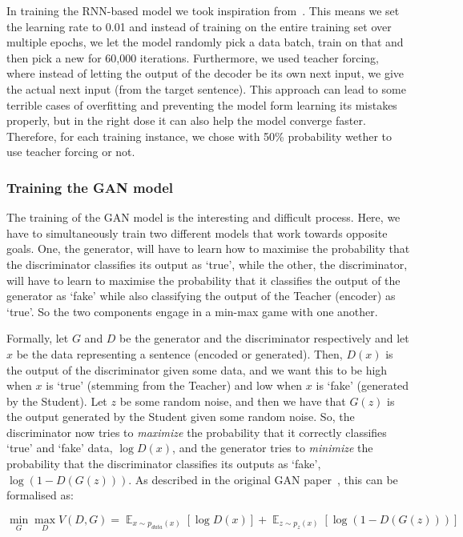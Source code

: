 \documentclass{article}
\DeclareMathOperator*{\E}{\mathbb{E}}
\begin{document}
In training the RNN-based model we took inspiration
from~\cite{pytorchTutorialAtt}. This means we set the learning rate to 0.01 and
instead of training on the entire training set over multiple epochs, we let the
model randomly pick a data batch, train on that and then pick a new for 60,000
iterations. Furthermore, we used teacher forcing, where instead of letting the
output of the decoder be its own next input, we give the actual next input (from
the target sentence). This approach can lead to some terrible cases of
overfitting and preventing the model form learning its mistakes properly, but in
the right dose it can also help the model converge faster. Therefore, for each
training instance, we chose with 50\% probability wether to use teacher forcing
or not.


\subsubsection{Training the GAN model}\label{sec:trainingGAN}

The training of the GAN model is the interesting and difficult process. Here, we
have to simultaneously train two different models that work towards opposite
goals. One, the generator, will have to learn how to maximise the probability
that the discriminator classifies its output as `true', while the other, the
discriminator, will have to learn to maximise the probability that it classifies
the output of the generator as `fake' while also classifying the output of the
Teacher (encoder) as `true'. So the two components engage in a min-max game
with one another.

Formally, let $G$ and $D$ be the generator and the discriminator respectively
and let $x$ be the data representing a sentence (encoded or generated). Then,
$D(x)$ is the output of the discriminator given some data, and we want this to
be high when $x$ is `true' (stemming from the Teacher) and low when $x$ is
`fake' (generated by the Student). Let $z$ be some random noise, and then we
have that $G(z)$ is the output generated by the Student given some random noise.
So, the discriminator now tries to \textit{maximize} the probability that it
correctly classifies `true' and `fake' data, $\log D(x)$, and the generator
tries to \textit{minimize} the probability that the discriminator classifies its
outputs as `fake', $\log(1 - D(G(z)))$. As described in the original GAN
paper~\cite{Goodfellow2014GenerativeAN}, this can be formalised as:

\[
    \min_G \max_D V(D,G) = {\E}_{x \sim p_{data}(x)}\left[\log D(x)\right] +
        {\E}_{z \sim p_{z}(x)}\left[\log(1 - D(G(z)))\right]
\] 
\end{document}
